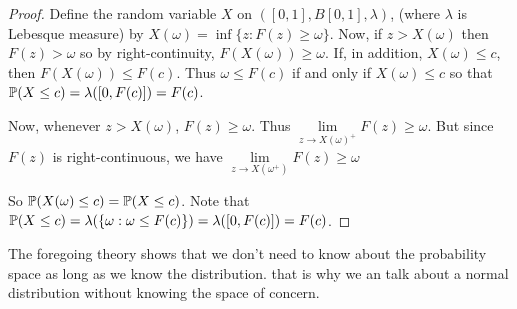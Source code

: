 \begin{proof}
Define the random variable $X$ on $([0,1], B[0,1], \lambda)$, (where $\lambda$ is Lebesque measure) by $X(\omega)=\inf\{z: F(z)\geq \omega \}$. Now, if $z>X(\omega)$ then $F(z)>\omega$ so by right-continuity, $F(X(\omega))\geq \omega$. If, in addition, $X(\omega)\leq c$, then $F(X(\omega))\leq F(c)$. Thus $\omega\leq F(c)$ if and only if $X(\omega)\leq c$ so that $\mathbb P(X\leq c)=\lambda([0,F(c)])=F(c)$.


Now, whenever $z> X(\omega)$, $F(z)\geq \omega$. Thus $\lim\limits_{z\to X(\omega)^+} F(z)\geq\omega$. But since $F(z)$ is right-continuous, we have $\lim\limits_{z\to X(\omega^+)} F(z)\geq\omega$


So $\mathbb P(X(\omega)\leq c)=\mathbb P(X\leq c)$. Note that $\mathbb P(X\leq c)=\lambda(\{\omega: \omega\leq F(c) \})=\lambda([0,F(c)])=F(c)$.
\end{proof}

The foregoing theory shows that we don't need to know about the probability space as long as we know the distribution. that is why we an talk about a normal distribution without knowing the space of concern.